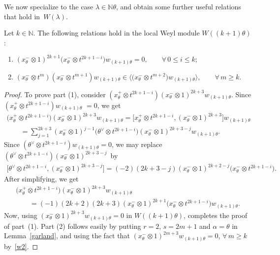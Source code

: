 We now specialize to the case $\lambda\in \mathbb{N}\theta$, and obtain some further useful relations that hold in~$W(\lambda)$.
\begin{lemma}
\label{g}
Let $k\in\mathbb{N}$.
The following relations hold in the local Weyl module $W((k+1)\theta)$:
\begin{enumerate}\itemsep=0pt
\item[$1)$] $(x^{-}_{\theta}\otimes 1)^{2k+1}\big(x^{-}_{\theta}\otimes t^{2k+1-i}\big)w_{(k+1)\theta}=0,
\qquad
\forall\,
0\leq i \leq k$;
\item[$2)$] $(x^{-}_{\theta}\otimes t^m)(x^{-}_{\theta} \otimes t^{m+1})  w_{(k+1)\theta} \in  \big\langle \big(x^{-}_{\theta}
\otimes t^{m+2}\big) w_{(k+1)\theta} \rangle,
\qquad
\forall\,
m\geq k$.
\end{enumerate}
\end{lemma}

\begin{proof}
To prove part (1), consider $(x^{+}_{\theta}\!\otimes t^{2k{+}1{-}i}) (x^{-}_{\theta}\otimes 1)^{2k{+}3}w_{(k{+}1)\theta}$.
Since $(x^{+}_{\theta}\!\otimes t^{2k{+}1{-}i})w_{(k{+}1)\theta}$ $=0$, we get
\begin{gather*}
\big(x^{+}_{\theta}\otimes t^{2k+1-i}\big) (x^{-}_{\theta}\otimes 1)^{2k+3}w_{(k+1)\theta}
=\big[x^{+}_{\theta}\otimes t^{2k+1-i}, (x^{-}_{\theta}\otimes 1)^{2k+3}\big] w_{(k+1)\theta}
\\
\qquad{}
=\sum\limits_{j=1}^{2k+3}  (x^{-}_{\theta}\otimes 1)^{j-1}\big(\theta^{\vee}\otimes t^{2k+1-i}\big)(x^{-}_{\theta}\otimes
1)^{2k+3-j}w_{(k+1)\theta}.
\end{gather*}
Since $(\theta^{\vee}\otimes t^{2k+1-i})w_{(k+1)\theta}=0$, we may replace $(\theta^{\vee}\otimes
t^{2k+1-i})(x^{-}_{\theta}\otimes 1)^{2k+3-j}$~by
\begin{gather*}
\big[\theta^{\vee}\otimes t^{2k+1-i}, (x^{-}_{\theta}\otimes 1)^{2k+3-j}\big]
=(-2)(2k+3-j)(x^{-}_{\theta}\otimes 1)^{2k+2-j}\big(x^{-}_{\theta}\otimes t^{2k+1-i}\big).
\end{gather*}
After simplifying, we get
\begin{gather*}
\big(x^{+}_{\theta}\otimes t^{2k+1-i}\big) (x^{-}_{\theta}\otimes 1)^{2k+3}w_{(k+1)\theta}
\\
\qquad{}
=(-1)(2k+2)(2k+3)(x^{-}_{\theta}\otimes 1)^{2k+1}\big(x^{-}_{\theta}\otimes t^{2k+1-i}\big)w_{(k+1)\theta}.
\end{gather*}
Now, using $(x^{-}_{\theta}\otimes 1)^{2k+3}w_{(k+1)\theta}=0$ in $W((k+1)\theta)$, completes the proof of part~(1).
Part (2) follows easily by putting $r=2$, $s=2m+1$ and $\alpha=\theta$ in Lemma~\ref{garland}, and using the fact that
$(x^{-}_{\theta}\otimes 1)^{2m+3}w_{(k+1)\theta}=0$, $\forall\,
m\geq k$ by~\eqref{w2}.
\end{proof}

